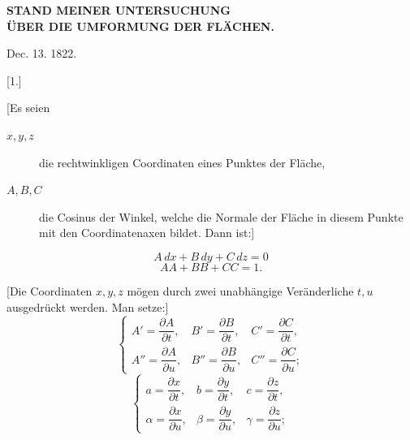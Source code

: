 \clearpage
{}%
\begin{center}\large\bfseries STAND MEINER UNTERSUCHUNG\\ ÜBER DIE UMFORMUNG DER FLÄCHEN.\end{center}
\begin{center}Dec. 13. 1822.\end{center}
\begin{center}[1.]\end{center}

[Es seien
\begin{description}
\item[$x,y,z$] die rechtwinkligen Coordinaten eines Punktes der Fläche,
\item[$A,B,C$] die Cosinus der Winkel, welche die Normale der Fläche in diesem Punkte mit den Coordinatenaxen bildet. Dann ist:]
\end{description}
\begin{equation}\tag*{[1]} A\,dx+B\,dy+C\,dz=0\end{equation}
\begin{equation}\tag*{[2]} AA+BB+CC=1.\end{equation}

[Die Coordinaten $x,y,z$ mögen durch zwei unabhängige Veränderliche $t,u$ ausgedrückt werden. Man setze:]
\begin{equation}\tag*{[3]}
\left\{\begin{array}{lll}
A'=\dfrac{\partial A}{\partial t},&B'=\dfrac{\partial B}{\partial t},&C'=\dfrac{\partial C}{\partial t},\\[6pt]
A''=\dfrac{\partial A}{\partial u},&B''=\dfrac{\partial B}{\partial u},&C''=\dfrac{\partial C}{\partial u};
\end{array}\right.
\end{equation}
\begin{equation}\tag*{[4]}
\left\{\begin{array}{lll}
a=\dfrac{\partial x}{\partial t},&b=\dfrac{\partial y}{\partial t},&c=\dfrac{\partial z}{\partial t},\\[6pt]
\alpha=\dfrac{\partial x}{\partial u},&\beta=\dfrac{\partial y}{\partial u},&\gamma=\dfrac{\partial z}{\partial u};
\end{array}\right.
\end{equation}
